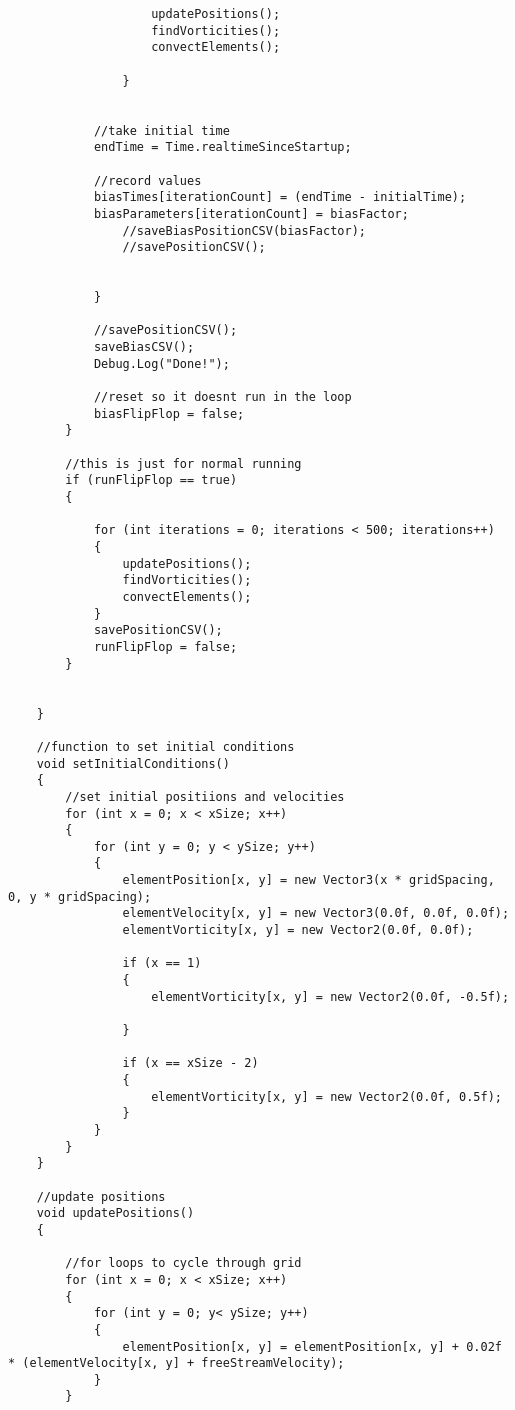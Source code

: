 \begin{mdframed}[linecolor=black, topline=true, bottomline=true,
  leftline=false, rightline=false]
\begin{verbatim}
                    updatePositions();
                    findVorticities();
                    convectElements();

                }
            

            //take initial time
            endTime = Time.realtimeSinceStartup;

            //record values
            biasTimes[iterationCount] = (endTime - initialTime);
            biasParameters[iterationCount] = biasFactor;
                //saveBiasPositionCSV(biasFactor);
                //savePositionCSV();


            }

            //savePositionCSV();
            saveBiasCSV();
            Debug.Log("Done!");

            //reset so it doesnt run in the loop
            biasFlipFlop = false;
        }

        //this is just for normal running
        if (runFlipFlop == true)
        {

            for (int iterations = 0; iterations < 500; iterations++)
            {
                updatePositions();
                findVorticities();
                convectElements();
            }
            savePositionCSV();
            runFlipFlop = false;
        }


    }

    //function to set initial conditions
    void setInitialConditions()
    {
        //set initial positiions and velocities
        for (int x = 0; x < xSize; x++)
        {
            for (int y = 0; y < ySize; y++)
            {
                elementPosition[x, y] = new Vector3(x * gridSpacing, 0, y * gridSpacing);
                elementVelocity[x, y] = new Vector3(0.0f, 0.0f, 0.0f);
                elementVorticity[x, y] = new Vector2(0.0f, 0.0f);

                if (x == 1)
                {
                    elementVorticity[x, y] = new Vector2(0.0f, -0.5f);

                }

                if (x == xSize - 2)
                {
                    elementVorticity[x, y] = new Vector2(0.0f, 0.5f);
                }
            }
        }
    }

    //update positions
    void updatePositions()
    {
        
        //for loops to cycle through grid
        for (int x = 0; x < xSize; x++)
        {
            for (int y = 0; y< ySize; y++)
            {
                elementPosition[x, y] = elementPosition[x, y] + 0.02f * (elementVelocity[x, y] + freeStreamVelocity);
            }
        }


\end{verbatim}
\end{mdframed}
